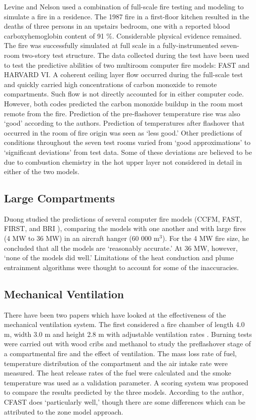 Levine and Nelson \cite{Valid:Levine} used a combination of full-scale fire testing and modeling to simulate a fire in a residence. The 1987 fire in a first-floor kitchen resulted in the deaths of three persons in an upstairs bedroom, one with a reported blood carboxyhemoglobin content of 91 \%. Considerable physical evidence remained. The fire was successfully simulated at full scale in a fully-instrumented seven-room two-story test structure. The data collected during the test have been used to test the predictive abilities of two multiroom computer fire models: FAST and HARVARD VI. A coherent ceiling layer flow occurred during the full-scale test and quickly carried high concentrations of carbon monoxide to remote compartments. Such flow is not directly accounted for in either computer code. However, both codes predicted the carbon monoxide buildup in the room most remote from the fire. Prediction of the pre-flashover temperature rise was also `good' according to the authors. Prediction of temperatures after flashover that occurred in the room of fire origin was seen as `less good.' Other predictions of conditions throughout the seven test rooms varied from `good approximations' to `significant deviations' from test data. Some of these deviations are believed to be due to combustion chemistry in the hot upper layer not considered in detail in either of the two models.

\subsection{Large Compartments}

Duong \cite{Valid:Duong} studied the predictions of several computer fire models (CCFM, FAST, FIRST, and BRI \cite{Models:BRI}), comparing the models with one another and with large fires (4 MW to 36 MW) in an aircraft hanger (60 000 m$^3$). For the 4 MW fire size, he concluded that all the models are `reasonably accurate.' At 36 MW, however, `none of the models did well.' Limitations of the heat conduction and plume entrainment algorithms were thought to account for some of the inaccuracies.

\subsection{Mechanical Ventilation}

There have been two papers which have looked at the effectiveness of the mechanical ventilation system. The first considered a fire chamber of length 4.0 m, width 3.0 m and height 2.8 m with adjustable ventilation rates \cite{Chow:1995a}. Burning tests were carried out with wood cribs and methanol to study the preflashover stage of a compartmental fire and the effect of ventilation. The mass loss rate of fuel, temperature distribution of the compartment and the air intake rate were measured. The heat release rates of the fuel were calculated and the smoke temperature was used as a validation parameter. A scoring system was proposed to compare the results predicted by the three models. According to the author, CFAST does `particularly well,' though there are some differences which can be attributed to the zone model approach.

